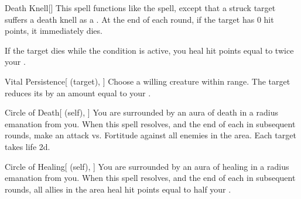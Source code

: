 \lowercase{\hypertarget{spell:Death Knell}{}}\label{spell:Death Knell}
\begin{apability}[\nth{2}]{\hypertarget{spell:Death Knell}{Death Knell}}[]
This spell functions like the  spell, except that a struck target suffers a death knell as a .
At the end of each round, if the target has 0 hit points, it immediately dies.

If the target dies while the condition is active, you heal hit points equal to twice your .
\end{apability}
\vspace{0.25em}



\lowercase{\hypertarget{spell:Vital Persistence}{}}\label{spell:Vital Persistence}
\begin{attuneability}[\nth{2}]{\hypertarget{spell:Vital Persistence}{Vital Persistence}}[ (target), ]
Choose a willing creature within \rngclose range.
The target reduces its  by an amount equal to your .
\end{attuneability}
\vspace{0.25em}



\lowercase{\hypertarget{spell:Circle of Death}{}}\label{spell:Circle of Death}
\begin{attuneability}[\nth{3}]{\hypertarget{spell:Circle of Death}{Circle of Death}}[ (self), ]
You are surrounded by an aura of death in a \areamed radius emanation from you.
When this spell resolves, and the end of each  in subsequent rounds, make an attack vs. Fortitude against all enemies in the area.
\hit Each target takes life  \minus2d.
\end{attuneability}
\vspace{0.25em}



\lowercase{\hypertarget{spell:Circle of Healing}{}}\label{spell:Circle of Healing}
\begin{attuneability}[\nth{3}]{\hypertarget{spell:Circle of Healing}{Circle of Healing}}[ (self), ]
You are surrounded by an aura of healing in a \areamed radius emanation from you.
When this spell resolves, and the end of each  in subsequent rounds, all allies in the area heal hit points equal to half your .
\end{attuneability}
\vspace{0.25em}



